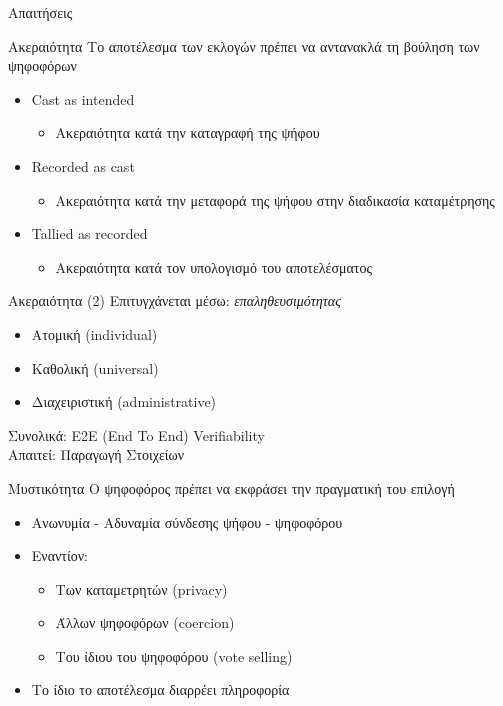 \documentclass[handout]{beamer}
\begin{document}
\begin{section}{Απαιτήσεις}

\begin{frame}{Ακεραιότητα}
Το αποτέλεσμα των εκλογών πρέπει να αντανακλά τη βούληση των ψηφοφόρων \pause
\begin{itemize}
     \item Cast as intended \pause 
     \begin{itemize}
         \item Ακεραιότητα κατά την καταγραφή της ψήφου
     \end{itemize}
     \item Recorded as cast \pause
     \begin{itemize}
         \item Ακεραιότητα κατά την μεταφορά της ψήφου στην διαδικασία καταμέτρησης
     \end{itemize}
     \item Tallied as recorded \pause
     \begin{itemize}
         \item Ακεραιότητα κατά τον υπολογισμό του αποτελέσματος
     \end{itemize}
\end{itemize}
\end{frame}
\begin{frame}{Ακεραιότητα (2)} 
Επιτυγχάνεται μέσω: \textit{επαληθευσιμότητας}
\begin{itemize} \pause
    \item Ατομική (individual)
    \item Καθολική (universal)
    \item Διαχειριστική (administrative)
\end{itemize} \pause
Συνολικά: E2E (End To End) Verifiability \\
Απαιτεί: Παραγωγή Στοιχείων
\end{frame}

\begin{frame}{Μυστικότητα}
O ψηφοφόρος πρέπει να εκφράσει την πραγματική του επιλογή \pause
\begin{itemize} 
\item Ανωνυμία - Αδυναμία σύνδεσης ψήφου - ψηφοφόρου
\item Εναντίον: \pause
\begin{itemize}
    \item Των καταμετρητών (privacy)
    \item Άλλων ψηφοφόρων (coercion)
    \item Του ίδιου του ψηφοφόρου (vote selling)
\end{itemize} \pause
\item Το ίδιο το αποτέλεσμα διαρρέει πληροφορία
\end{itemize}
\end{frame}


\end{section}
\end{document}

